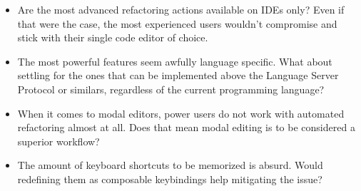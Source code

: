 \documentclass{article}
\begin{document}
\begin{itemize}
	\item Are the most advanced refactoring actions available on IDEs only? Even
	      if that were the case, the most experienced users wouldn't compromise
	      and stick with their single code editor of choice.
	\item The most powerful features seem awfully language specific. What about
	      settling for the ones that can be implemented above the Language Server
	      Protocol or similars, regardless of the current programming language?
	\item When it comes to modal editors, power users do not work with automated
	      refactoring almost at all. Does that mean modal editing is to be
	      considered a superior workflow?
	\item The amount of keyboard shortcuts to be memorized is absurd. Would
	      redefining them as composable keybindings help mitigating the issue?
\end{itemize}
\end{document}
